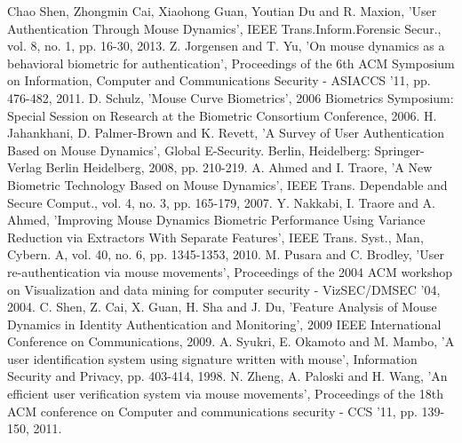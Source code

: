 \documentclass[conference]{IEEEtran}
\begin{document}
\begin{thebibliography}{100} %


 Chao Shen, Zhongmin Cai, Xiaohong Guan, Youtian Du and R. Maxion, 'User Authentication Through Mouse Dynamics', IEEE Trans.Inform.Forensic Secur., vol. 8, no. 1, pp. 16-30, 2013.
 Z. Jorgensen and T. Yu, 'On mouse dynamics as a behavioral biometric for authentication', Proceedings of the 6th ACM Symposium on Information, Computer and Communications Security - ASIACCS '11, pp. 476-482, 2011.
D. Schulz, 'Mouse Curve Biometrics', 2006 Biometrics Symposium: Special Session on Research at the Biometric Consortium Conference, 2006.
 H. Jahankhani, D. Palmer-Brown and K. Revett, 'A Survey of User Authentication Based on Mouse Dynamics', Global E-Security. Berlin, Heidelberg: Springer-Verlag Berlin Heidelberg, 2008, pp. 210-219.
 A. Ahmed and I. Traore, 'A New Biometric Technology Based on Mouse Dynamics', IEEE Trans. Dependable and Secure Comput., vol. 4, no. 3, pp. 165-179, 2007.
Y. Nakkabi, I. Traore and A. Ahmed, 'Improving Mouse Dynamics Biometric Performance Using Variance Reduction via Extractors With Separate Features', IEEE Trans. Syst., Man, Cybern. A, vol. 40, no. 6, pp. 1345-1353, 2010.
M. Pusara and C. Brodley, 'User re-authentication via mouse movements', Proceedings of the 2004 ACM workshop on Visualization and data mining for computer security - VizSEC/DMSEC '04, 2004.
C. Shen, Z. Cai, X. Guan, H. Sha and J. Du, 'Feature Analysis of Mouse Dynamics in Identity Authentication and Monitoring', 2009 IEEE International Conference on Communications, 2009.
A. Syukri, E. Okamoto and M. Mambo, 'A user identification system using signature written with mouse', Information Security and Privacy, pp. 403-414, 1998.
N. Zheng, A. Paloski and H. Wang, 'An efficient user verification system via mouse movements', Proceedings of the 18th ACM conference on Computer and communications security - CCS '11, pp. 139-150, 2011.

\end{thebibliography}
\end{document}
